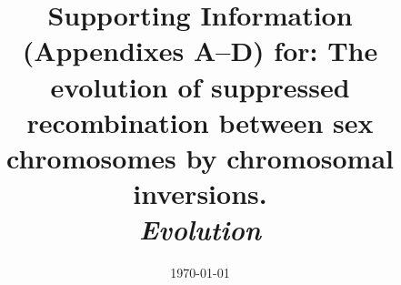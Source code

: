 \documentclass{article}
\begin{document}
\title{Supporting Information (Appendixes A--D) for: The evolution of suppressed recombination between sex chromosomes by chromosomal inversions.\\ 
\textit{Evolution}}


%

\date{\today}
\maketitle




\bigskip

\newpage{}
\tableofcontents
\newpage
\end{document}
